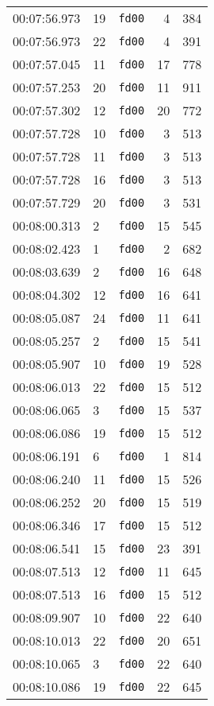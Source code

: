 \documentclass{article}
\begin{document}
\begin{longtable}{lllrr}
00:07:56.973 & 19 & \texttt{fd00} & 4 & 384 \\
00:07:56.973 & 22 & \texttt{fd00} & 4 & 391 \\
00:07:57.045 & 11 & \texttt{fd00} & 17 & 778 \\
00:07:57.253 & 20 & \texttt{fd00} & 11 & 911 \\
00:07:57.302 & 12 & \texttt{fd00} & 20 & 772 \\
00:07:57.728 & 10 & \texttt{fd00} & 3 & 513 \\
00:07:57.728 & 11 & \texttt{fd00} & 3 & 513 \\
00:07:57.728 & 16 & \texttt{fd00} & 3 & 513 \\
00:07:57.729 & 20 & \texttt{fd00} & 3 & 531 \\
00:08:00.313 & 2 & \texttt{fd00} & 15 & 545 \\
00:08:02.423 & 1 & \texttt{fd00} & 2 & 682 \\
00:08:03.639 & 2 & \texttt{fd00} & 16 & 648 \\
00:08:04.302 & 12 & \texttt{fd00} & 16 & 641 \\
00:08:05.087 & 24 & \texttt{fd00} & 11 & 641 \\
00:08:05.257 & 2 & \texttt{fd00} & 15 & 541 \\
00:08:05.907 & 10 & \texttt{fd00} & 19 & 528 \\
00:08:06.013 & 22 & \texttt{fd00} & 15 & 512 \\
00:08:06.065 & 3 & \texttt{fd00} & 15 & 537 \\
00:08:06.086 & 19 & \texttt{fd00} & 15 & 512 \\
00:08:06.191 & 6 & \texttt{fd00} & 1 & 814 \\
00:08:06.240 & 11 & \texttt{fd00} & 15 & 526 \\
00:08:06.252 & 20 & \texttt{fd00} & 15 & 519 \\
00:08:06.346 & 17 & \texttt{fd00} & 15 & 512 \\
00:08:06.541 & 15 & \texttt{fd00} & 23 & 391 \\
00:08:07.513 & 12 & \texttt{fd00} & 11 & 645 \\
00:08:07.513 & 16 & \texttt{fd00} & 15 & 512 \\
00:08:09.907 & 10 & \texttt{fd00} & 22 & 640 \\
00:08:10.013 & 22 & \texttt{fd00} & 20 & 651 \\
00:08:10.065 & 3 & \texttt{fd00} & 22 & 640 \\
00:08:10.086 & 19 & \texttt{fd00} & 22 & 645 \\

\end{longtable}
\end{document}
